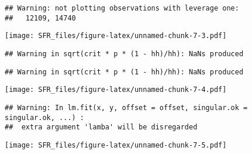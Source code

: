 \documentclass[]{article}
\begin{document}
\begin{verbatim}
## Warning: not plotting observations with leverage one:
##   12109, 14740
\end{verbatim}

\texttt{[image: SFR\_files/figure-latex/unnamed-chunk-7-3.pdf]}

\begin{verbatim}
## Warning in sqrt(crit * p * (1 - hh)/hh): NaNs produced
\end{verbatim}

\begin{verbatim}
## Warning in sqrt(crit * p * (1 - hh)/hh): NaNs produced
\end{verbatim}

\texttt{[image: SFR\_files/figure-latex/unnamed-chunk-7-4.pdf]}

\begin{verbatim}
## Warning: In lm.fit(x, y, offset = offset, singular.ok = singular.ok, ...) :
##  extra argument 'lamba' will be disregarded
\end{verbatim}

\texttt{[image: SFR\_files/figure-latex/unnamed-chunk-7-5.pdf]}
\end{document}

